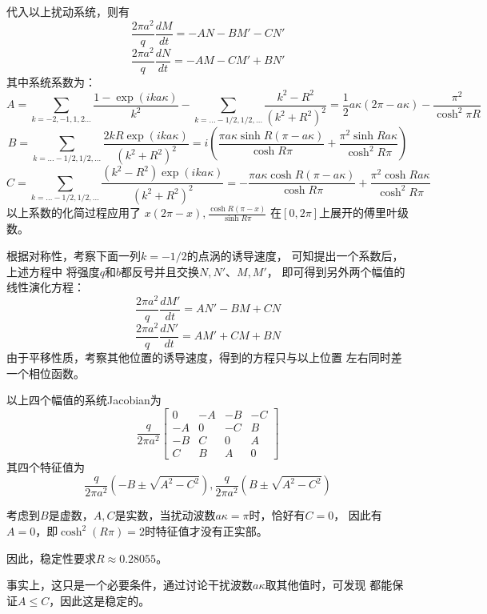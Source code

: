 \documentclass[UTF8,zihao=5]{ctexart} %
\begin{document}
代入以上扰动系统，则有
$$
    \frac{2\pi a^2}{q}\frac{d M}{dt} = - AN - B M' -C N'
$$
$$
    \frac{2\pi a^2}{q}\frac{d N}{dt} = - AM - C M' +B N'
$$
其中系统系数为：
$$
    A = \sum_{k=-2,-1,1,2\dots}
    {
        \frac{1-\exp(ika\kappa)}{k^2}
    }
    -
    \sum_{k = \dots-1/2,1/2,\dots}
    {
        \frac{k^2 - R^2}{(k^2 + R^2)^2}
    }
    =
    \frac{1}{2}a\kappa(2\pi - a\kappa) - \frac{\pi^2}{\cosh^2 \pi R}
$$
$$
    B =
    \sum_{k = \dots-1/2,1/2,\dots}
    {
        \frac{2kR\exp(i ka\kappa ) }{(k^2 + R^2)^2}
    }
    =
    i\left(
    \frac{\pi a\kappa \sinh{R(\pi - a\kappa)}}{ \cosh{R\pi}}
    +
    \frac{\pi^2\sinh{Ra\kappa}}{\cosh^2{R\pi}}
    \right)
$$
$$
    C =
    \sum_{k = \dots-1/2,1/2,\dots}
    {
        \frac{(k^2-R^2)\exp(i ka\kappa ) }{(k^2 + R^2)^2}
    }
    =
    -\frac{\pi a\kappa \cosh{R(\pi - a\kappa)}}{ \cosh{R\pi}}
    +
    \frac{\pi^2\cosh{Ra\kappa}}{\cosh^2{R\pi}}
$$
以上系数的化简过程应用了
$
x(2\pi - x), \frac{\cosh{R(\pi - x)}}{\sinh{R\pi}}
$
在$[0,2\pi]$上展开的傅里叶级数。


根据对称性，考察下面一列$k=-1/2$的点涡的诱导速度，
可知提出一个系数后，上述方程中
将强度$q$和$b$都反号并且交换$N,N'$、$M,M'$，
即可得到另外两个幅值的线性演化方程：
$$
    \frac{2\pi a^2}{q}\frac{d M'}{dt} = AN' - B M+ C N
$$
$$
    \frac{2\pi a^2}{q}\frac{d N'}{dt} = AM' +C M +B N
$$
由于平移性质，考察其他位置的诱导速度，得到的方程只与以上位置
左右同时差一个相位函数。

以上四个幅值的系统Jacobian为
$$
    \frac{q}{2\pi a^2}\left[\begin{array}{cccc} 0 & -A & -B & -C\\ -A & 0 & -C & B\\ -B & C & 0 & A\\ C & B & A & 0 \end{array}\right]
$$
其四个特征值为
$$
    \frac{q}{2\pi a^2}(-B\pm\sqrt{A^2-C^2}), \frac{q}{2\pi a^2}(B\pm\sqrt{A^2-C^2})
$$

考虑到$B$是虚数，$A,C$是实数，当扰动波数$a\kappa=\pi$时，恰好有$C=0$，
因此有$A=0$，即$\cosh^2(R\pi)=2$时特征值才没有正实部。

因此，稳定性要求$R\approx0.28055$。

事实上，这只是一个必要条件，通过讨论干扰波数$a\kappa$取其他值时，可发现
都能保证$A\leq C$，因此这是稳定的。
\end{document}
